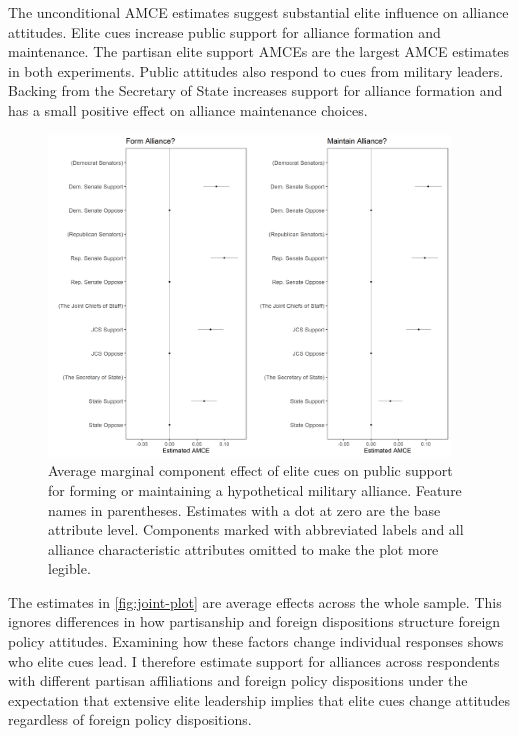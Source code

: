 \documentclass[12pt]{article}
\begin{document}
The unconditional AMCE estimates suggest substantial elite influence on alliance attitudes. 
Elite cues increase public support for alliance formation and maintenance. 
The partisan elite support AMCEs are the largest AMCE estimates in both experiments.
Public attitudes also respond to cues from military leaders.
Backing from the Secretary of State increases support for alliance formation and has a small positive effect on alliance maintenance choices. 


\begin{figure}[htpb]
	\centering
		\includegraphics[width=0.95\textwidth]{../figures/joint-amce-plots-el.png}
	\caption{Average marginal component effect of elite cues on public support for forming or maintaining a hypothetical military alliance. Feature names in parentheses. Estimates with a dot at zero are the base attribute level. Components marked with abbreviated labels and all alliance characteristic attributes omitted to make the plot more legible.}
	\label{fig:joint-plot}
\end{figure}


The estimates in \autoref{fig:joint-plot} are average effects across the whole sample. 
This ignores differences in how partisanship and foreign dispositions structure foreign policy attitudes.
Examining how these factors change individual responses shows who elite cues lead.  
I therefore estimate support for alliances across respondents with different partisan affiliations and foreign policy dispositions under the expectation that extensive elite leadership implies that elite cues change attitudes regardless of foreign policy dispositions. 
\end{document}
